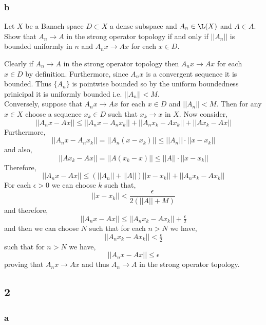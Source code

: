 \documentclass[12pt]{article}
\begin{document}
\subsubsection{b}

\begin{exercise}
Let $X$ be a Banach space $D \subset X$ a dense subspace and $A_n \in \L(X)$ and $A \in A$. Show that $A_n \to A$ in the strong operator topology if and only if $|| A_n ||$ is bounded uniformly in $n$ and $A_n x \to A x$ for each $x \in D$.
\end{exercise}

Clearly if $A_n \to A$ in the strong operator topology then $A_n x \to A x$ for each $x \in D$ by definition. Furthermore, since $A_n x$ is a convergent sequence it is bounded. Thus $\{ A_n \}$ is pointwise bounded so by the uniform boundedness prinicipal it is uniformly bounded i.e. $|| A_n || < M$.
\bigskip\\
Conversely, suppose that $A_n x \to A x$ for each $x \in D$ and $|| A_n || < M$. Then for any $x \in X$ choose a sequence $x_k \in D$ such that $x_k \to x$ in $X$. Now consider,
\[ || A_n x - A x || \le || A_n x - A_n x_k || + || A_n x_k - A x_k || + || A x_k - A x|| \]
Furthermore,
\[ || A_n x - A_n x_k|| = || A_n (x - x_k) || \le || A_n || \cdot || x - x_k || \]
and also,
\[ || A x_k - A x || = || A (x_k - x) || \le || A || \cdot || x - x_k || \]
Therefore,
\[ || A_n x - A x|| \le (|| A_n || + || A ||) || x - x_k || + || A_n x_k - A x_k || \]
For each $\epsilon > 0$ we can choose $k$ such that,
\[ || x - x_k || < \frac{\epsilon}{2(|| A || + M)} \]
and therefore,
\[ || A_n x - A x|| \le || A_n x_k - A x_k || + \tfrac{\epsilon}{2} \]
and then we can choose $N$ such that for each $n > N$ we have,
\[ || A_n x_k - A x_k || < \tfrac{\epsilon}{2} \]
such that for $n > N$ we have,
\[ || A_n x - A x || \le \epsilon \]
proving that $A_n x \to A x$ and thus $A_n \to A$ in the strong operator topology.

\subsection{2}

\subsubsection{a}
\end{document}
